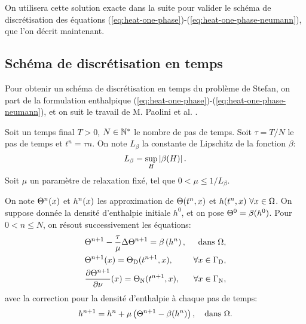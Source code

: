 On utilisera cette solution exacte dans la suite pour valider le schéma de
discrétisation des équations
(\ref{eq:heat-one-phase})-(\ref{eq:heat-one-phase-neumann}), que l'on
décrit maintenant.

\subsection*{Schéma de discrétisation en temps}
Pour obtenir un schéma de discrétisation en temps du problème de
Stefan, on part de la formulation enthalpique
(\ref{eq:heat-one-phase})-(\ref{eq:heat-one-phase-neumann}), et on
suit le travail de M. Paolini et al. \cite{Paolini1988}.

Soit un temps final $T > 0$, $N\in \mathbb {\mathbb N^*}$ le nombre de pas de
temps. Soit $\tau = T / N$ le pas de temps et $t^n = \tau n$. On note
$L_\beta$ la constante de Lipschitz de la fonction $\beta$:
\begin{equation}
  L_\beta = \sup_{H}\left\lvert \beta(H) \right\rvert.
\end{equation}
Soit $\mu$ un paramètre de relaxation fixé, tel que $0 < \mu \leq
1/L_\beta$.

On note $\Theta^n(x)$ et $h^n(x)$ les approximation
de $\Theta(t^n, x)$ et $h(t^n, x)\ \forall x\in
\Omega$.  On suppose donnée la densité d'enthalpie initiale $h^0$, et
on pose $\Theta^0 = \beta(h^0)$. Pour $0 < n \leq N$, on résout
successivement les équations:
\begin{align}
  &\temperature^{n+1} - \frac{\tau}{\mu} \Delta \temperature^{n+1} = %
  \beta\parent{\enthalpydensity^n}, & \text{dans } \Omega,\label{eq:chernoff-heat}\\
  &\temperature^{n+1}(x) = \temperature_{\mathrm D}(t^{n+1}, x), &
  \forall x\in%
  \Gamma_\mathrm{D},\label{eq:chernoff-dirichlet}\\
  &\frac{\partial\temperature^{n+1}}{\partial \nu}(x) = %
  \temperature_\mathrm{N}(t^{n+1}, x), %
  & \forall x \in \Gamma_\mathrm{N},\label{eq:chernoff-neumann}
\end{align}
avec la correction pour la densité d'enthalpie à chaque pas de temps:
\begin{equation}\label{eq:chernoff-update}
h^{n+1} = h^{n} +
\mu\left( \Theta^{n+1} - \beta(h^{n}) \right), \quad
\text{dans } \Omega.
\end{equation}

